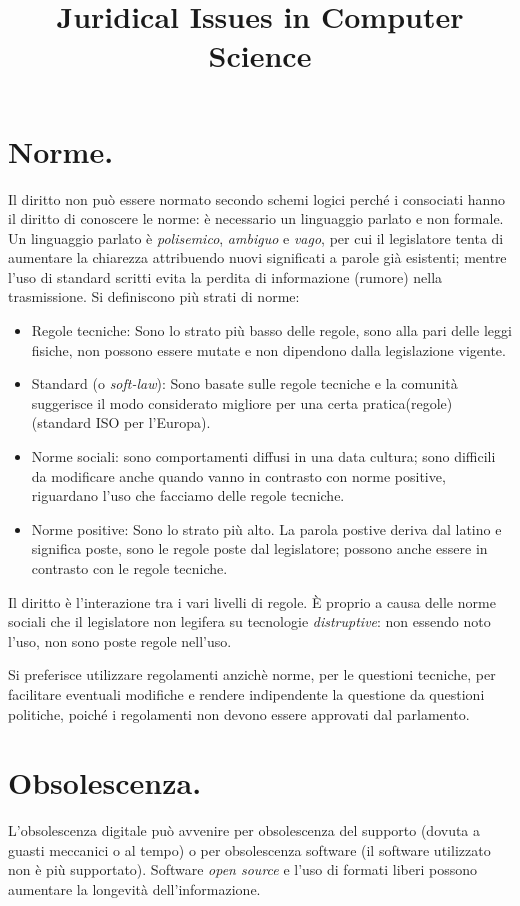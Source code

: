 \documentclass[a4page, 11pt, twocolumn]{article}
\title{Juridical Issues in Computer Science}
\date{}
\begin{document}
\maketitle



\section{Norme.}
Il diritto non può essere normato secondo schemi logici perché i consociati hanno il diritto di conoscere le norme: è necessario un linguaggio parlato e non formale.
Un linguaggio parlato è \textit{polisemico}, \textit{ambiguo} e \textit{vago}, per cui il legislatore tenta di aumentare la chiarezza attribuendo nuovi significati a parole già esistenti; mentre l'uso di standard scritti evita la perdita di informazione (rumore) nella trasmissione. \newline
Si definiscono più strati di norme:
\begin{itemize}
\item Regole tecniche: Sono lo strato più basso delle regole, sono alla pari delle leggi fisiche, non possono essere mutate e non dipendono dalla legislazione vigente. 
\item Standard (o \textit{soft-law}): Sono basate sulle regole tecniche e la comunità suggerisce il modo considerato migliore per una certa pratica(regole) (standard ISO per l'Europa).
\item Norme sociali: sono comportamenti diffusi in una data cultura; sono difficili da modificare anche quando vanno in contrasto con norme positive, riguardano l'uso che facciamo delle regole tecniche.
\item Norme positive: Sono lo strato più alto. La parola postive deriva dal latino e significa poste, sono le regole poste dal legislatore; possono anche essere in contrasto con le regole tecniche.
\end{itemize}
Il diritto è l'interazione tra i vari livelli di regole. \newline
È proprio a causa delle norme sociali che il legislatore non legifera su tecnologie \textit{distruptive}: non essendo noto l'uso, non sono poste regole nell'uso.

Si preferisce utilizzare regolamenti anzichè norme, per le questioni tecniche, per facilitare eventuali modifiche e rendere indipendente la questione da questioni politiche, poiché i regolamenti non devono essere approvati dal parlamento.

\section{Obsolescenza.}
L'obsolescenza digitale può avvenire per obsolescenza del supporto (dovuta a guasti meccanici o al tempo) o per obsolescenza software (il software utilizzato non è più supportato).
Software \textit{open source} e l'uso di formati liberi possono aumentare la longevità dell'informazione.
\end{document}
